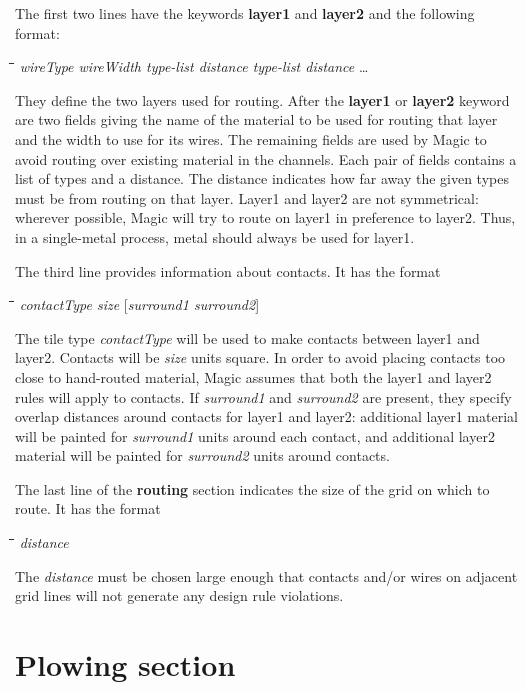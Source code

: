 \documentclass[letterpaper,twoside,12pt]{article}
\def\hinch{\hspace*{0.5in}}
\def\starti{\begin{center}\begin{tabbing}\hinch\=\hinch\=\hinch\=\hinch\=\kill}
\def\endi{\end{tabbing}\end{center}}
\def\ii{\>\>\>}
\begin{document}
The first two lines have the keywords {\bfseries layer1} and {\bfseries layer2}
and the following format:

\starti
    \ii {\bfseries layer1} {\itshape wireType wireWidth type-list distance
	type-list distance} \dots
\endi

They define the two layers used for routing.  After the {\bfseries layer1}
or {\bfseries layer2} keyword are two fields giving the name of the material
to be used for routing that layer and the width to use for its wires.
The remaining fields are used by Magic to avoid routing over existing
material in the channels.  Each pair of fields contains a list of
types and a distance.  The distance indicates how far away the given
types must be from routing on that layer.  Layer1 and layer2
are not symmetrical:  wherever possible, Magic will try to
route on layer1 in preference to layer2.  Thus, in a single-metal
process, metal should always be used for layer1.

The third line provides information about contacts.  It has the format

\starti
   \ii {\bfseries contacts} {\itshape contactType size }
	[{\itshape surround1 surround2}]
\endi

The tile type {\itshape contactType}
will be used to make contacts between layer1 and layer2.  Contacts
will be {\itshape size} units square.  In order to avoid placing contacts
too close to hand-routed material, Magic assumes that both the layer1
and layer2 rules will apply to contacts.  If {\itshape surround1} and
{\itshape surround2} are present, they specify overlap distances around
contacts for layer1 and layer2:  additional layer1 material will be
painted for {\itshape surround1} units around each contact, and additional
layer2 material will be painted for {\itshape surround2} units around
contacts.

The last line of the {\bfseries routing} section indicates the size of
the grid on which to route.  It has the format

\starti
   \ii {\bfseries gridspacing} {\itshape distance}
\endi

The {\itshape distance} must be chosen large enough that
contacts and/or wires on adjacent grid lines will not generate
any design rule violations.

\section{Plowing section}
\end{document}

